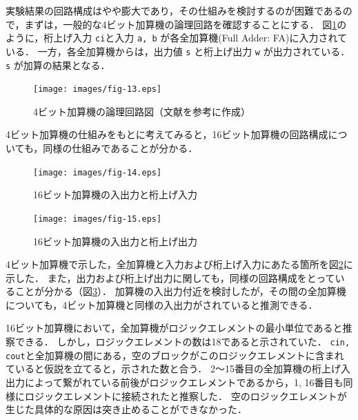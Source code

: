 \documentclass[uplatex]{jsarticle}
\begin{document}
実験結果の回路構成はやや膨大であり，その仕組みを検討するのが困難であるので，まずは，一般的な4ビット加算機の論理回路を確認することにする．
図\ref{fig:13}のように，桁上げ入力 {\tt ci}と入力 {\tt a, b} が各全加算機(Full Adder: FA)に入力されている．
一方，各全加算機からは，出力値 {\tt s} と桁上げ出力 {\tt w} が出力されている．
{\tt s} が加算の結果となる．

\begin{figure}[htb]
  \begin{center}
    \texttt{[image: images/fig-13.eps]}
    \caption{4ビット加算機の論理回路図（文献\cite{hdl}を参考に作成）}
    \label{fig:13}
  \end{center}
\end{figure}

4ビット加算機の仕組みをもとに考えてみると，16ビット加算機の回路構成についても，同様の仕組みであることが分かる．

\begin{figure}[htb]
  \begin{center}
    \texttt{[image: images/fig-14.eps]}
    \caption{16ビット加算機の入出力と桁上げ入力}
    \label{fig:14}
  \end{center}
\end{figure}

\begin{figure}[htb]
  \begin{center}
    \texttt{[image: images/fig-15.eps]}
    \caption{16ビット加算機の入出力と桁上げ出力}
    \label{fig:15}
  \end{center}
\end{figure}

4ビット加算機で示した，全加算機と入力および桁上げ入力にあたる箇所を図\ref{fig:14}に示した．
また，出力および桁上げ出力に関しても，同様の回路構成をとっていることが分かる（図\ref{fig:15}）．
加算機の入出力付近を検討したが，その間の全加算機についても，4ビット加算機と同様の入出力がされていると推測できる．

16ビット加算機において，全加算機がロジックエレメントの最小単位であると推察できる．
しかし，ロジックエレメントの数は18であると示されていた．
{\tt cin, cout}と全加算機の間にある，空のブロックがこのロジックエレメントに含まれていると仮説を立てると，示された数と合う．
2〜15番目の全加算機の桁上げ入出力によって繋がれている前後がロジックエレメントであるから，1, 16番目も同様にロジックエレメントに接続されたと推察した．
空のロジックエレメントが生じた具体的な原因は突き止めることができなかった．

\clearpage
\end{document}
